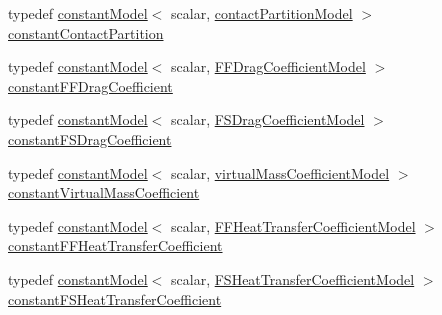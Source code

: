 \begin{DoxyCompactItemize}
\item 
typedef \hyperlink{classFoam_1_1constantModel}{constant\+Model}$<$ scalar, \hyperlink{classFoam_1_1contactPartitionModel}{contact\+Partition\+Model} $>$ \hyperlink{namespaceFoam_a52a37eca9ce7726c3c7b8c585ac45fec}{constant\+Contact\+Partition}
\item 
typedef \hyperlink{classFoam_1_1constantModel}{constant\+Model}$<$ scalar, \hyperlink{classFoam_1_1FFDragCoefficientModel}{F\+F\+Drag\+Coefficient\+Model} $>$ \hyperlink{namespaceFoam_af1318ccc11265440ed0af331cb695819}{constant\+F\+F\+Drag\+Coefficient}
\item 
typedef \hyperlink{classFoam_1_1constantModel}{constant\+Model}$<$ scalar, \hyperlink{classFoam_1_1FSDragCoefficientModel}{F\+S\+Drag\+Coefficient\+Model} $>$ \hyperlink{namespaceFoam_a45a431a6ad4bd9b4663987ce40f64f3e}{constant\+F\+S\+Drag\+Coefficient}
\item 
typedef \hyperlink{classFoam_1_1constantModel}{constant\+Model}$<$ scalar, \hyperlink{classFoam_1_1virtualMassCoefficientModel}{virtual\+Mass\+Coefficient\+Model} $>$ \hyperlink{namespaceFoam_a3ed635b90e17336f27203e329ff4691e}{constant\+Virtual\+Mass\+Coefficient}
\item 
typedef \hyperlink{classFoam_1_1constantModel}{constant\+Model}$<$ scalar, \hyperlink{classFoam_1_1FFHeatTransferCoefficientModel}{F\+F\+Heat\+Transfer\+Coefficient\+Model} $>$ \hyperlink{namespaceFoam_a52ece67744a1564202ddbe77f715659e}{constant\+F\+F\+Heat\+Transfer\+Coefficient}
\item 
typedef \hyperlink{classFoam_1_1constantModel}{constant\+Model}$<$ scalar, \hyperlink{classFoam_1_1FSHeatTransferCoefficientModel}{F\+S\+Heat\+Transfer\+Coefficient\+Model} $>$ \hyperlink{namespaceFoam_a1a8374d33d29cd2e004e8a98ac1f3d32}{constant\+F\+S\+Heat\+Transfer\+Coefficient}
\end{DoxyCompactItemize}
